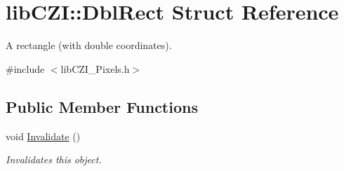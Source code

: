 \hypertarget{structlib_c_z_i_1_1_dbl_rect}{}\section{lib\+C\+ZI\+:\+:Dbl\+Rect Struct Reference}
\label{structlib_c_z_i_1_1_dbl_rect}


A rectangle (with double coordinates).  




{\ttfamily \#include $<$lib\+C\+Z\+I\+\_\+\+Pixels.\+h$>$}

\subsection*{Public Member Functions}
\begin{DoxyCompactItemize}
\item 
\mbox{\label{structlib_c_z_i_1_1_dbl_rect_a3eb28e789f023aa43531d7917d6ba54d}} 
void \hyperlink{structlib_c_z_i_1_1_dbl_rect_a3eb28e789f023aa43531d7917d6ba54d}{Invalidate} ()
\begin{DoxyCompactList}\small\item\em Invalidates this object. \end{DoxyCompactList}\end{DoxyCompactItemize}
